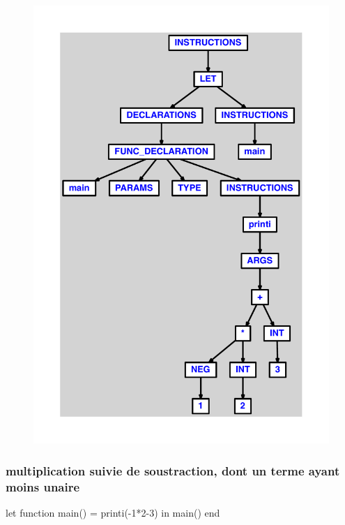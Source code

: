 \documentclass{article}
\begin{document}
\begin{figure}[H]\centering\includegraphics[max width=\textwidth]{ast/ast_71.pdf}\end{figure}\subsubsection{multiplication suivie de soustraction, dont un terme ayant moins unaire}
\begin{verbatimtab}
let
	function main() = printi(-1*2-3)
in main() end
\end{verbatimtab}
\end{document}
